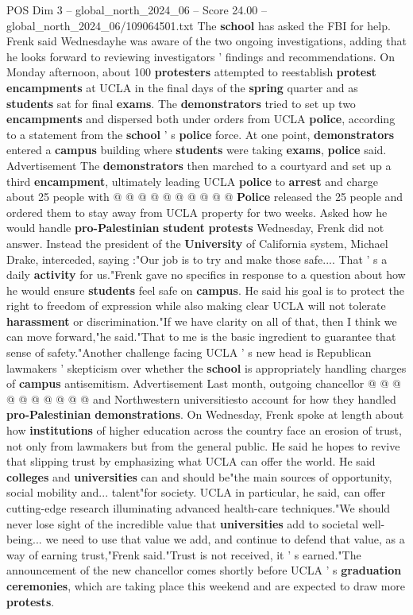\begin{textsample}{POS Dim 3 – global\_north\_2024\_06 – Score 24.00 – global\_north\_2024\_06/109064501.txt}
The \textbf{school} has asked the FBI for help.
Frenk said Wednesdayhe was aware of the two ongoing investigations, adding that he looks forward to reviewing investigators ' findings and recommendations.
On Monday afternoon, about 100 \textbf{protesters} attempted to reestablish \textbf{protest} \textbf{encampments} at UCLA in the final days of the \textbf{spring} quarter and as \textbf{students} sat for final \textbf{exams}.
The \textbf{demonstrators} tried to set up two \textbf{encampments} and dispersed both under orders from UCLA \textbf{police}, according to a statement from the \textbf{school} ' s \textbf{police} force.
At one point, \textbf{demonstrators} entered a \textbf{campus} building where \textbf{students} were taking \textbf{exams}, \textbf{police} said.
Advertisement The \textbf{demonstrators} then marched to a courtyard and set up a third \textbf{encampment}, ultimately leading UCLA \textbf{police} to \textbf{arrest} and charge about 25 people with @ @ @ @ @ @ @ @ @ @ \textbf{Police} released the 25 people and ordered them to stay away from UCLA property for two weeks.
Asked how he would handle \textbf{pro-Palestinian} \textbf{student} \textbf{protests} Wednesday, Frenk did not answer.
Instead the president of the \textbf{University} of California system, Michael Drake, interceded, saying :"Our job is to try and make those safe....
That ' s a daily \textbf{activity} for us."Frenk gave no specifics in response to a question about how he would ensure \textbf{students} feel safe on \textbf{campus}.
He said his goal is to protect the right to freedom of expression while also making clear UCLA will not tolerate \textbf{harassment} or discrimination."If we have clarity on all of that, then I think we can move forward,"he said."That to me is the basic ingredient to guarantee that sense of safety."Another challenge facing UCLA ' s new head is Republican lawmakers ' skepticism over whether the \textbf{school} is appropriately handling charges of \textbf{campus} antisemitism.
Advertisement Last month, outgoing chancellor @ @ @ @ @ @ @ @ @ @ and Northwestern universitiesto account for how they handled \textbf{pro-Palestinian} \textbf{demonstrations}.
On Wednesday, Frenk spoke at length about how \textbf{institutions} of higher education across the country face an erosion of trust, not only from lawmakers but from the general public.
He said he hopes to revive that slipping trust by emphasizing what UCLA can offer the world.
He said \textbf{colleges} and \textbf{universities} can and should be"the main sources of opportunity, social mobility and... talent"for society.
UCLA in particular, he said, can offer cutting-edge research illuminating advanced health-care techniques."We should never lose sight of the incredible value that \textbf{universities} add to societal well-being... we need to use that value we add, and continue to defend that value, as a way of earning trust,"Frenk said."Trust is not received, it ' s earned."The announcement of the new chancellor comes shortly before UCLA ' s \textbf{graduation} \textbf{ceremonies}, which are taking place this weekend and are expected to draw more \textbf{protests}.


\end{textsample}
